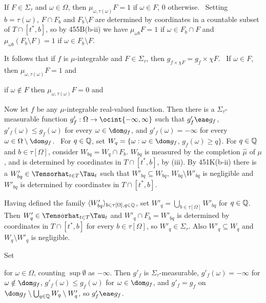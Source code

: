 {\medskip

 If $F\in\Sigma_{\tau}$ and $\omega\in\Omega$, then
$\mu_{\omega,\tau(\omega)}F=1$ if $\omega\in F$, $0$ otherwise.   \Prf\
Setting $b=\tau(\omega)$, $F\cap F_b$ and $F_b\setminus F$
are determined by coordinates
in a countable subset of $T\cap[t^*,b]$, so by 455B(b-ii) we have
$\mu_{\omega b}F=1$ if $\omega\in F_b\cap F$ and
$\mu_{\omega b}(F_b\setminus F)=1$ if $\omega\in F_b\setminus F$.\ \Qed

It follows that if $f$ is $\mu$-integrable and $F\in\Sigma_{\tau}$, then
$g_{f\times\chi F}=g_f\times\chi F$.   \Prf\ If $\omega\in F$, then
$\mu_{\omega,\tau(\omega)}F=1$ and


\noindent if $\omega\notin F$ then $\mu_{\omega,\tau(\omega)}F=0$ and


\medskip

 Now let $f$ be any $\mu$-integrable real-valued function.
Then there
is a $\Sigma_{\tau}$-measurable function
$g'_f:\Omega\to\ocint{-\infty,\infty}$
such that $g'_f\eae g_f$, $g'_f(\omega)\le g_f(\omega)$ for every
$\omega\in\dom g_f$, and $g'_f(\omega)=-\infty$ for every
$\omega\in\Omega\setminus\dom g_f$.   \Prf\ For $q\in\Bbb Q$, set
$W_q=\{\omega:\omega\in\dom g_f$, $g_f(\omega)\ge q\}$.
For $q\in\Bbb Q$ and $b\in\tau[\Omega]$, consider $W_{bq}=W_q\cap F_b$.
$W_{bq}$ is measured by the completion $\hat\mu$ of $\mu$,
and is determined by coordinates in $T\cap[t^*,b]$, by (iii).
By 451K(b-ii) there is a
$W'_{bq}\in\Tensorhat_{t\in T}\Tau_t$ such that
$W'_{bq}\subseteq W_{bq}$, $W_{bq}\setminus W'_{bq}$ is negligible and
$W'_{bq}$ is determined by coordinates in $T\cap [t^*,b]$.

Having defined the family
$\langle W'_{bq}\rangle_{b\in\tau[\Omega],q\in\Bbb Q}$, set
$W'_q=\bigcup_{b\in\tau[\Omega]}W'_{bq}$ for $q\in\Bbb Q$.   Then
$W'_q\in\Tensorhat_{t\in T}\Tau_t$ and
$W'_q\cap F_b=W'_{bq}$ is determined by
coordinates in $T\cap[t^*,b]$ for every $b\in\tau[\Omega]$, so
$W'_q\in\Sigma_{\tau}$.   Also
$W'_q\subseteq W_q$ and $W_q\setminus W'_q$ is negligible.

Set


\noindent for $\omega\in\Omega$, counting $\sup\emptyset$ as
$-\infty$.   Then $g'_f$ is $\Sigma_{\tau}$-measurable,
$g'_f(\omega)=-\infty$ for $\omega\notin\dom g_f$,
$g'_f(\omega)\le g_f(\omega)$ for $\omega\in\dom g_f$, and
$g'_f=g_f$ on $\dom g_f\setminus\bigcup_{q\in\Bbb Q}W_q\setminus W'_q$, so
$g'_f\eae g_f$.\ \Qed

}
